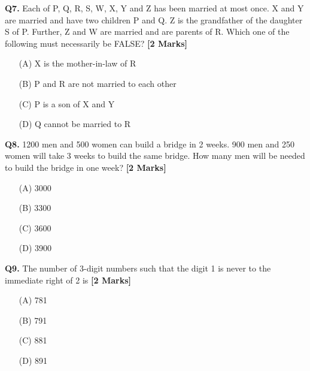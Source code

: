 \documentclass[11pt]{article}
\newcommand{\questionb}[2]{
    \noindent\textbf{Q#2.} #1 \hfill \textbf{[2 Marks]}
}
\begin{document}
\vspace{0.5cm}

\questionb{Each of P, Q, R, S, W, X, Y and Z has been married at most once. X and Y are married and have two children P and Q. Z is the grandfather of the daughter S of P. Further, Z and W are married and are parents of R. Which one of the following must necessarily be FALSE?}{7}
\begin{enumerate}
    \item[(A)] X is the mother-in-law of R
    \item[(B)] P and R are not married to each other
    \item[(C)] P is a son of X and Y
    \item[(D)] Q cannot be married to R
\end{enumerate}

\vspace{0.5cm}

\questionb{1200 men and 500 women can build a bridge in 2 weeks. 900 men and 250 women will take 3 weeks to build the same bridge. How many men will be needed to build the bridge in one week?}{8}
\begin{enumerate}
    \item[(A)] 3000
    \item[(B)] 3300
    \item[(C)] 3600
    \item[(D)] 3900
\end{enumerate}

\vspace{0.5cm}

\questionb{The number of 3-digit numbers such that the digit 1 is never to the immediate right of 2 is}{9}
\begin{enumerate}
    \item[(A)] 781
    \item[(B)] 791
    \item[(C)] 881
    \item[(D)] 891
\end{enumerate}

\vspace{0.5cm}
\end{document}
